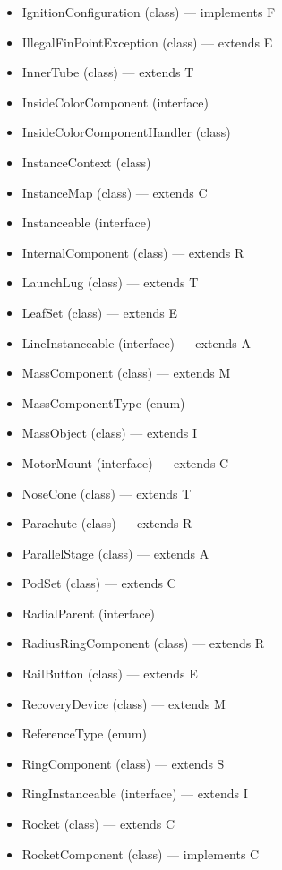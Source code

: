 \documentclass{amsdtx}
\begin{document}
\begin{itemize}
\begin{itemize}
\begin{itemize}
    \item
      IgnitionConfiguration (class) --- implements F
    \item
      IllegalFinPointException (class) --- extends E
    \item
      InnerTube (class) --- extends T
    \item
      InsideColorComponent (interface)
    \item
      InsideColorComponentHandler (class)
    \item
      InstanceContext (class)
    \item
      InstanceMap (class) --- extends C
    \item
      Instanceable (interface)
    \item
      InternalComponent (class) --- extends R
    \item
      LaunchLug (class) --- extends T
    \item
      LeafSet (class) --- extends E
    \item
      LineInstanceable (interface) --- extends A
    \item
      MassComponent (class) --- extends M
    \item
      MassComponentType (enum)
    \item
      MassObject (class) --- extends I
    \item
      MotorMount (interface) --- extends C
    \item
      NoseCone (class) --- extends T
    \item
      Parachute (class) --- extends R
    \item
      ParallelStage (class) --- extends A
    \item
      PodSet (class) --- extends C
    \item
      RadialParent (interface)
    \item
      RadiusRingComponent (class) --- extends R
    \item
      RailButton (class) --- extends E
    \item
      RecoveryDevice (class) --- extends M
    \item
      ReferenceType (enum)
    \item
      RingComponent (class) --- extends S
    \item
      RingInstanceable (interface) --- extends I
    \item
      Rocket (class) --- extends C
    \item
      RocketComponent (class) --- implements C

\end{itemize}
\end{itemize}
\end{itemize}
\end{document}
